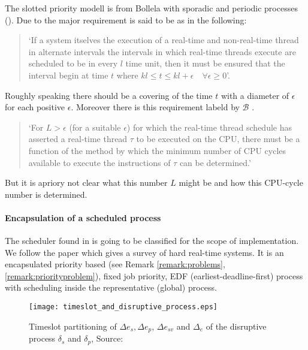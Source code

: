 	The slotted priority modell is from Bollela \cite{B97} with  sporadic and periodic processes (\cite{K}).
	Due to \cite{B97} the major requirement is said to be as in the following:
	
	\begin{quote}
		`If a system itselves the execution of a real-time and non-real-time thread in alternate intervals the intervals in which real-time threads execute are scheduled to be in every $l$ time unit, then it must be ensured that the interval begin at time $t$ where $kl \leq t \leq kl+\epsilon \quad \forall \epsilon \geq 0$'.
	\end{quote}
	
	Roughly speaking there should be a covering of the time $t$ with a diameter of $\epsilon$ for each positive $\epsilon$.
	Moreover there is this requirement labeld by  $\mathcal{B}$ \cite{B97}.
	\begin{quote}
		`For $L>\epsilon$ (for a suitable $\epsilon$) for which the real-time thread schedule has asserted a real-time thread $\tau$ to be executed on the CPU, there must be a function of the method by which the minimum number of CPU cycles available to execute the instructions of $\tau$ can be determined.'
	\end{quote}
	But it is apriory not clear what this number $L$ might be and how this CPU-cycle number is determined.
	
	\paragraph*{Encapsulation of a scheduled process}
	 
		The scheduler found in \cite{K} is going to be classified for the scope of implementation. 
		We follow the paper \cite{DB2011} which gives a survey of hard real-time systems.
		It is an encapsulated priority based (see Remark \ref{remark:problems}, \ref{remark:priorityproblem}), fixed job priority,   EDF (earliest-deadline-first) process with scheduling inside the representative (global) process.
	
	
	\begin{figure}[h]
		\centering
		\texttt{[image: timeslot\_and\_disruptive\_process.eps]}
		\caption{Timeslot partitioning of  $\Delta e_s, \Delta e_p$, $\Delta e_{sv}$ and $\Delta_e$ of the disruptive process $\delta_s$ and $\delta_p$, Source: \cite{K}}
		\label{fig:timeslots}
	\end{figure}
	
